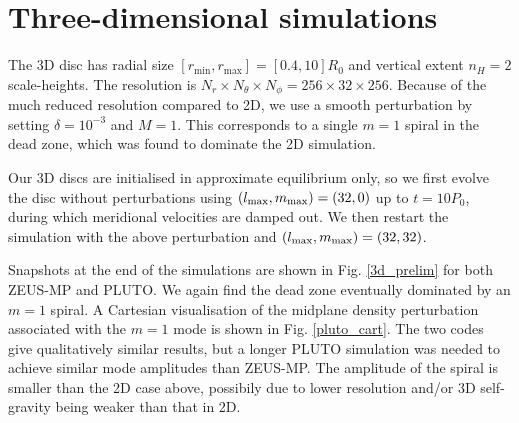 \section{Three-dimensional simulations}
The 3D disc has radial size 
$[r_\mathrm{min},r_\mathrm{max}]=[0.4,10]R_0$ and vertical extent
$n_H=2$ scale-heights. The resolution is $N_r\times N_\theta\times
N_\phi=256\times32\times256$. Because of the much reduced resolution
compared to 2D, we use a smooth perturbation by setting
$\delta = 10^{-3}$ and $M=1$. This corresponds to a single $m=1$
spiral in the dead zone, which was found to dominate the 2D
simulation. 

Our 3D discs are initialised in approximate equilibrium only, so we
first evolve the disc without perturbations using  
$(l_\mathrm{max},m_\mathrm{max})=(32,0)$ up to $t=10P_0$, during which 
meridional velocities are damped out. We then restart the simulation
with the above perturbation and $(l_\mathrm{max},m_\mathrm{max})=(32,32)$. 

Snapshots at the end of the simulations are shown in
Fig. \ref{3d_prelim} for both ZEUS-MP and PLUTO. We again find the dead zone eventually
dominated by an $m=1$ spiral. A Cartesian visualisation of the
midplane density perturbation associated with the $m=1$ mode is shown in Fig. \ref{pluto_cart}.
The two codes give qualitatively similar results, but a longer PLUTO simulation was
needed to achieve similar mode amplitudes than ZEUS-MP. 
The amplitude of the spiral is smaller than the 2D case above,
possibily due to lower resolution and/or 3D self-gravity being weaker
than that in 2D.  

